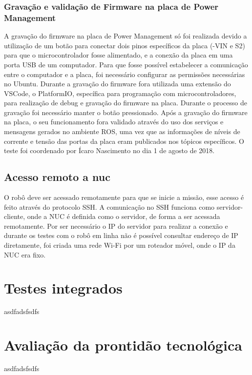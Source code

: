 \subsubsection{Gravação  e validação de Firmware na placa de Power Management}
A gravação do firmware na placa de Power Management só foi realizada devido a utilização de um botão para conectar dois pinos específicos da placa (-VIN e S2) para que o microcontrolador fosse alimentado, e a conexão da placa em uma porta USB de um computador. 
Para que fosse possível estabelecer a comunicação entre o computador e a placa, foi necessário configurar as permissões necessárias no Ubuntu. Durante a gravação do firmware fora utilizada uma extensão do VSCode, o PlatformIO, específica para programação com microcontroladores, para realização de debug e gravação do firmware na placa. 
Durante o processo de gravação foi necessário manter o botão pressionado. Após a gravação do firmware na placa, o seu funcionamento fora validado através do uso dos serviços e mensagens gerados no ambiente ROS, uma vez que as informações de níveis de corrente e tensão das portas da placa eram publicados nos tópicos específicos. O teste foi coordenado por Ícaro Nascimento no dia 1 de agosto de 2018.

\subsection{Acesso remoto a nuc}
O robô deve ser acessado remotamente para que se inicie a missão, esse acesso é feito através do protocolo SSH.
A comunicação no SSH funciona como servidor-cliente, onde a NUC é definida como o servidor, de forma a ser acessada remotamente. Por ser necessário o IP do servidor para realizar a conexão e durante os testes com o robô em linha não é possível consultar endereço de IP diretamente, foi criada uma rede Wi-Fi por um roteador móvel, onde o IP da NUC era fixo.



\section{Testes integrados}
\label{sec:testi}
asdfadsfsdfs

\section{Avaliação da prontidão tecnológica}
\label{sec:trl}
asdfadsfsdfs


